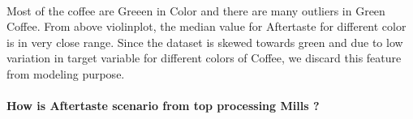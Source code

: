 \documentclass[11pt]{article}
\begin{document}
    \begin{center}
    \end{center}
    { \hspace*{\fill} \\}
    
    Most of the coffee are Greeen in Color and there are many outliers in
Green Coffee. From above violinplot, the median value for Aftertaste for
different color is in very close range. Since the dataset is skewed
towards green and due to low variation in target variable for different
colors of Coffee, we discard this feature from modeling purpose.

    \hypertarget{how-is-aftertaste-scenario-from-top-processing-mills}{%
\paragraph{How is Aftertaste scenario from top processing Mills
?}\label{how-is-aftertaste-scenario-from-top-processing-mills}}
\end{document}
